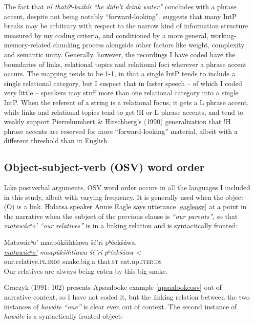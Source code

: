 \documentclass[output=paper]{LSP/langsci}
\begin{document}
The fact that \emph{ní thatóⁿ-bazhíi “he didn’t drink water”} concludes with a phrase accent, despite not being notably “forward-looking”, suggests that many IntP breaks may be arbitrary with respect to the narrow kind of information structure measured by my coding criteria, and conditioned by a more general, working-memory-related chunking process alongside other factors like weight, complexity and semantic unity. Generally, however, the recordings I have coded have the boundaries of links, relational topics and relational foci wherever a phrase accent occurs. The mapping tends to be 1-1, in that a single IntP tends to include a single relational category, but I suspect that in faster speech -- of which I coded very little -- speakers may stuff more than one relational category into a single IntP. When the referent of a string is a relational focus, it gets a L phrase accent, while links and relational topics tend to get !H or L phrase accents, and tend to weakly support Pierrehumbert \& Hirschberg’s (1990) generalization that !H phrase accents are reserved for more “forward-looking” material, albeit with a different threshold than in English.

\subsection{Object-subject-verb (OSV) word order}\label{osv}

Like postverbal arguments, OSV word order occurs in all the languages I included in this study, albeit with varying frequency. It is generally used when the object (O) is a link. Hidatsa speaker Annie Eagle says utterance \ref{eagleosv} at a point in the narrative when the subject of the previous clause is ‎\emph{“our parents”}, so that \emph{matawácʰo’ “our relatives”} is in a linking relation and is syntactically fronted:

\ea\label{eagleosv}
Matawácʰo’ maapúkšihtíawa šé’ri pʰéekšáwa.\footnotemark\\
\gll	\emph{\underline{matawácʰo’}}		\emph{maapúkšihtíawa} 	\emph{šé’ri} 	\emph{pʰéekšáwa <}\\
	our.relative.\textsc{pl.indf} 		snake.big.a 			that.\textsc{st} 	eat.up.\textsc{iter.ds}\\
\glt	Our relatives are always being eaten by this big snake.
\z

Graczyk (1991: 102) presents Apsaalooke example \ref{apsaalookeosv} out of narrative context, so I have not coded it, but the linking relation between the two instances of \emph{hawáte “one”} is clear even out of context. The second instance of \emph{hawáte} is a syntactically fronted object:
\end{document}

